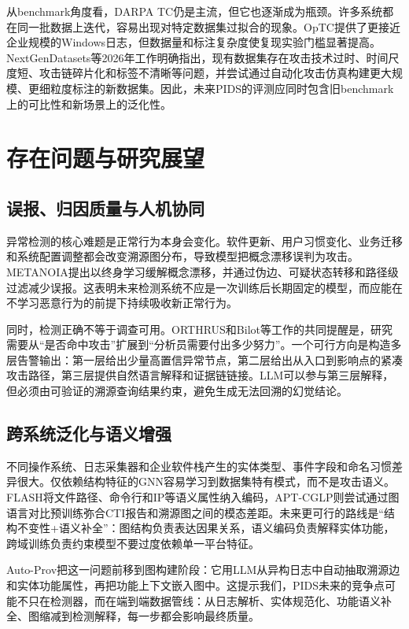 从benchmark角度看，DARPA TC仍是主流，但它也逐渐成为瓶颈。许多系统都在同一批数据上迭代，容易出现对特定数据集过拟合的现象。OpTC提供了更接近企业规模的Windows日志，但数据量和标注复杂度使复现实验门槛显著提高。NextGenDatasets等2026年工作明确指出，现有数据集存在攻击技术过时、时间尺度短、攻击链碎片化和标签不清晰等问题，并尝试通过自动化攻击仿真构建更大规模、更细粒度标注的新数据集\citep{nextgendatasets2026}。因此，未来PIDS的评测应同时包含旧benchmark上的可比性和新场景上的泛化性。

\section{存在问题与研究展望}

\subsection{误报、归因质量与人机协同}

异常检测的核心难题是正常行为本身会变化。软件更新、用户习惯变化、业务迁移和系统配置调整都会改变溯源图分布，导致模型把概念漂移误判为攻击。METANOIA提出以终身学习缓解概念漂移，并通过伪边、可疑状态转移和路径级过滤减少误报\citep{metanoia2025}。这表明未来检测系统不应是一次训练后长期固定的模型，而应能在不学习恶意行为的前提下持续吸收新正常行为。

同时，检测正确不等于调查可用。ORTHRUS和Bilot等工作的共同提醒是，研究需要从“是否命中攻击”扩展到“分析员需要付出多少努力”。一个可行方向是构造多层告警输出：第一层给出少量高置信异常节点，第二层给出从入口到影响点的紧凑攻击路径，第三层提供自然语言解释和证据链链接。LLM可以参与第三层解释，但必须由可验证的溯源查询结果约束，避免生成无法回溯的幻觉结论。

\subsection{跨系统泛化与语义增强}

不同操作系统、日志采集器和企业软件栈产生的实体类型、事件字段和命名习惯差异很大。仅依赖结构特征的GNN容易学习到数据集特有模式，而不是攻击语义。FLASH将文件路径、命令行和IP等语义属性纳入编码，APT-CGLP则尝试通过图语言对比预训练弥合CTI报告和溯源图之间的模态差距\citep{flash2024,aptcglp2025}。未来更可行的路线是“结构不变性+语义补全”：图结构负责表达因果关系，语义编码负责解释实体功能，跨域训练负责约束模型不要过度依赖单一平台特征。

Auto-Prov把这一问题前移到图构建阶段：它用LLM从异构日志中自动抽取溯源边和实体功能属性，再把功能上下文嵌入图中\citep{autoprov2026}。这提示我们，PIDS未来的竞争点可能不只在检测器，而在端到端数据管线：从日志解析、实体规范化、功能语义补全、图缩减到检测解释，每一步都会影响最终质量。

